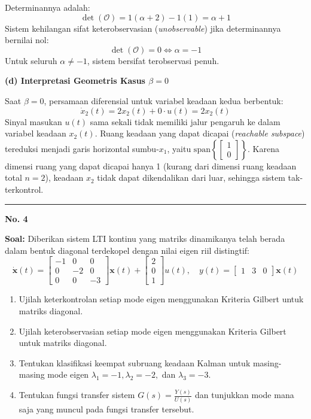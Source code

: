 \documentclass[11pt,a4paper]{article}
\begin{document}
Determinannya adalah:
$$\det(\mathcal{O}) = 1(\alpha + 2) - 1(1) = \alpha + 1$$
Sistem kehilangan sifat keterobservasian (\textit{unobservable}) jika determinannya bernilai nol:
$$\det(\mathcal{O}) = 0 \iff \alpha = -1$$
Untuk seluruh $\alpha \ne -1$, sistem bersifat terobservasi penuh.

\textbf{(d) Interpretasi Geometris Kasus $\beta = 0$}

Saat $\beta = 0$, persamaan diferensial untuk variabel keadaan kedua berbentuk:
$$\dot{x}_2(t) = 2x_2(t) + 0 \cdot u(t) = 2x_2(t)$$
Sinyal masukan $u(t)$ sama sekali tidak memiliki jalur pengaruh ke dalam variabel keadaan $x_2(t)$. Ruang keadaan yang dapat dicapai (\textit{reachable subspace}) tereduksi menjadi garis horizontal sumbu-$x_1$, yaitu $\text{span}\left\{\begin{bmatrix} 1 \\ 0 \end{bmatrix}\right\}$. Karena dimensi ruang yang dapat dicapai hanya 1 (kurang dari dimensi ruang keadaan total $n = 2$), keadaan $x_2$ tidak dapat dikendalikan dari luar, sehingga sistem tak-terkontrol.

\vspace{12pt}
\hrule
\vspace{10pt}

\textbf{\large No. 4}

\textbf{Soal:}  
Diberikan sistem LTI kontinu yang matriks dinamikanya telah berada dalam bentuk diagonal terdekopel dengan nilai eigen riil distingtif:
$$\dot{\mathbf{x}}(t) = \begin{bmatrix} -1 & 0 & 0 \\ 0 & -2 & 0 \\ 0 & 0 & -3 \end{bmatrix} \mathbf{x}(t) + \begin{bmatrix} 2 \\ 0 \\ 1 \end{bmatrix} u(t), \quad y(t) = \begin{bmatrix} 1 & 3 & 0 \end{bmatrix} \mathbf{x}(t)$$
\begin{enumerate}[label=(\alph*)]
    \item Ujilah keterkontrolan setiap mode eigen menggunakan Kriteria Gilbert untuk matriks diagonal.
    \item Ujilah keterobservasian setiap mode eigen menggunakan Kriteria Gilbert untuk matriks diagonal.
    \item Tentukan klasifikasi keempat subruang keadaan Kalman untuk masing-masing mode eigen $\lambda_1 = -1, \lambda_2 = -2,$ dan $\lambda_3 = -3$.
    \item Tentukan fungsi transfer sistem $G(s) = \frac{Y(s)}{U(s)}$ dan tunjukkan mode mana saja yang muncul pada fungsi transfer tersebut.
\end{enumerate}
\end{document}
